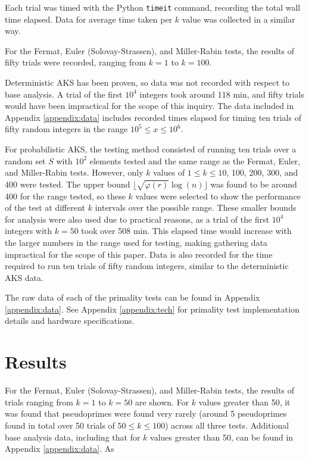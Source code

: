 \documentclass{article}
\begin{document}
Each trial was timed with the Python \texttt{timeit} command, recording the total wall time elapsed. Data for average time taken per $k$ value was collected in a similar way. 

For the Fermat, Euler (Solovay-Strassen), and Miller-Rabin tests, the results of fifty trials were recorded, ranging from $k = 1$ to $k = 100$.

Deterministic AKS has been proven, so data was not recorded with respect to base analysis. A trial of the first $10^4$ integers took around 118 min, and fifty trials would have been impractical for the scope of this inquiry. The data included in Appendix \ref{appendix:data} includes recorded times elapsed for timing ten trials of fifty random integers in the range $10^5 \leq x \leq 10^6$. %

For probabilistic AKS, the testing method consisted of running ten trials over a random set $S$ with $10^2$ elements tested and the same range as the Fermat, Euler, and Miller-Rabin tests. However, only $k$ values of $1 \leq k \leq 10$, 100, 200, 300, and 400 were tested. The upper bound $\lfloor \sqrt{\varphi(r)}\log(n) \rfloor$ was found to be around 400 for the range tested, so these $k$ values were selected to show the performance of the test at different $k$ intervals over the possible range. These smaller bounds for analysis were also used due to practical reasons, as a trial of the first $10^4$ integers with $k = 50$ took over 508 min. This elapsed time would increase with the larger numbers in the range used for testing, making gathering data impractical for the scope of this paper. Data is also recorded for the time required to run ten trials of fifty random integers, similar to the deterministic AKS data. %

The raw data of each of the primality tests can be found in Appendix \ref{appendix:data}.
See Appendix \ref{appendix:tech} for primality test implementation details and hardware specifications.

\section{Results}
For the Fermat, Euler (Solovay-Strassen), and Miller-Rabin tests, the results of trials ranging from $k = 1$ to $k = 50$ are shown. For $k$ values greater than 50, it was found that pseudoprimes were found very rarely (around 5 pseudoprimes found in total over 50 trials of $50 \leq k \leq 100$) across all three tests. Additional base analysis data, including that for $k$ values greater than 50, can be found in Appendix \ref{appendix:data}. As 
\end{document}
